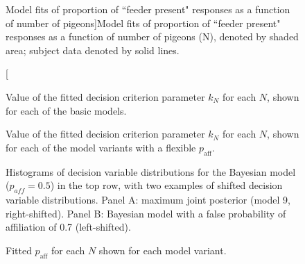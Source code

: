 \documentclass{article}
\begin{document}
\begin{figure}[ht]
\begin{center}
   \caption[Model fits of proportion of ``feeder present" responses as a function of number of pigeons]{Model fits of proportion of ``feeder present" responses as a function of number of pigeons (N), denoted by shaded area; subject data denoted by solid lines.} 
   \label{fig:all_fig_NC1C0}
\end{center}
\end{figure}

\begin{figure}[ht]
\begin{center}
   \caption[Fitted decision criterion parameter $k_N$ for each $N$]{Value of the fitted decision criterion parameter $k_N$ for each $N$, shown for each of the basic models.} 
   \label{fig:ks}
\end{center}
\end{figure}

\begin{figure}[ht]
\begin{center}
   \caption[Fitted decision criterion parameter $k_N$ for each $N$ for flexible $p_{\text{aff}}$ model variants]{Value of the fitted decision criterion parameter $k_N$ for each $N$, shown for each of the model variants with a flexible $p_{\text{aff}}$.} 
   \label{fig:ks_paff}
\end{center}
\end{figure}

\begin{figure}[ht]
\begin{center}
   \caption[Histograms of decision variable distributions for example models]{Histograms of decision variable distributions for the Bayesian model ($p_{aff} = 0.5$) in the top row, with two examples of shifted decision variable distributions. Panel A: maximum joint posterior (model 9, right-shifted). Panel B:  Bayesian model with a false probability of affiliation of 0.7 (left-shifted).} 
   \label{fig:didactic}
\end{center}
\end{figure}

\begin{figure}[ht]
\begin{center}
   \caption[Probabiltiy of affiliation ($p_{\text{aff}}$) fits across $N$]{Fitted $p_{\text{aff}}$ for each $N$ shown for each model variant.} 
   \label{fig:paffall}
\end{center}
\end{figure}
\end{document}
